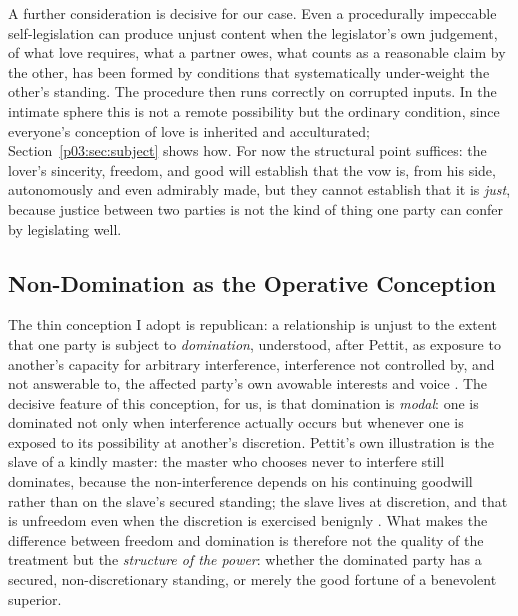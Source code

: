 A further consideration is decisive for our case. Even a procedurally impeccable self-legislation can produce unjust content when the legislator's own judgement, of what love requires, what a partner owes, what counts as a reasonable claim by the other, has been formed by conditions that systematically under-weight the other's standing. The procedure then runs correctly on corrupted inputs. In the intimate sphere this is not a remote possibility but the ordinary condition, since everyone's conception of love is inherited and acculturated; Section~\ref{p03:sec:subject} shows how. For now the structural point suffices: the lover's sincerity, freedom, and good will establish that the vow is, from his side, autonomously and even admirably made, but they cannot establish that it is \emph{just}, because justice between two parties is not the kind of thing one party can confer by legislating well.

\subsection{Non-Domination as the Operative Conception}

The thin conception I adopt is republican: a relationship is unjust to the extent that one party is subject to \emph{domination}, understood, after Pettit, as exposure to another's capacity for arbitrary interference, interference not controlled by, and not answerable to, the affected party's own avowable interests and voice \parencite{pettit1997republicanism}. The decisive feature of this conception, for us, is that domination is \emph{modal}: one is dominated not only when interference actually occurs but whenever one is exposed to its possibility at another's discretion. Pettit's own illustration is the slave of a kindly master: the master who chooses never to interfere still dominates, because the non-interference depends on his continuing goodwill rather than on the slave's secured standing; the slave lives at discretion, and that is unfreedom even when the discretion is exercised benignly \parencite{pettit1997republicanism}. What makes the difference between freedom and domination is therefore not the quality of the treatment but the \emph{structure of the power}: whether the dominated party has a secured, non-discretionary standing, or merely the good fortune of a benevolent superior.

